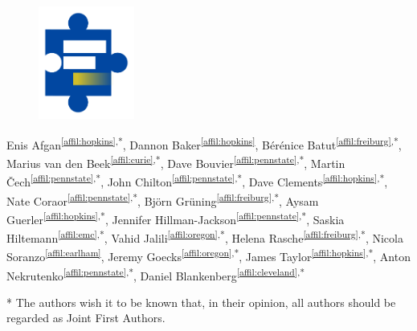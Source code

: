 \setcounter{NAT@ctr}{-1}
\cleartorightpage
\chapter*{}\label{chapter:galaxy}

\begin{figure}[t!]
\centering
\includegraphics[height=10em]{frontmatter/images/chapter-header-galaxy.png}
\end{figure}
\vspace{-4cm}

\begin{changemargin}{0cm}{2cm}
\end{changemargin}


Enis Afgan\textsuperscript{\ref{affil:hopkins},*},
Dannon Baker\textsuperscript{\ref{affil:hopkins}},
Bérénice Batut\textsuperscript{\ref{affil:freiburg},*},
Marius van den Beek\textsuperscript{\ref{affil:curie},*},
Dave Bouvier\textsuperscript{\ref{affil:pennstate},*},
Martin Čech\textsuperscript{\ref{affil:pennstate},*},
John Chilton\textsuperscript{\ref{affil:pennstate},*},
Dave Clements\textsuperscript{\ref{affil:hopkins},*},
Nate Coraor\textsuperscript{\ref{affil:pennstate},*},
Björn Grüning\textsuperscript{\ref{affil:freiburg},*},
Aysam Guerler\textsuperscript{\ref{affil:hopkins},*},
Jennifer Hillman-Jackson\textsuperscript{\ref{affil:pennstate},*},
Saskia Hiltemann\textsuperscript{\ref{affil:emc},*},
Vahid Jalili\textsuperscript{\ref{affil:oregon},*},
Helena Rasche\textsuperscript{\ref{affil:freiburg},*},
Nicola Soranzo\textsuperscript{\ref{affil:earlham}},
Jeremy Goecks\textsuperscript{\ref{affil:oregon},*},
James Taylor\textsuperscript{\ref{affil:hopkins},*},
Anton Nekrutenko\textsuperscript{\ref{affil:pennstate},*},
Daniel Blankenberg\textsuperscript{\ref{affil:cleveland},*}

* The authors wish it to be known that, in their opinion, all authors should be regarded as Joint First Authors.


